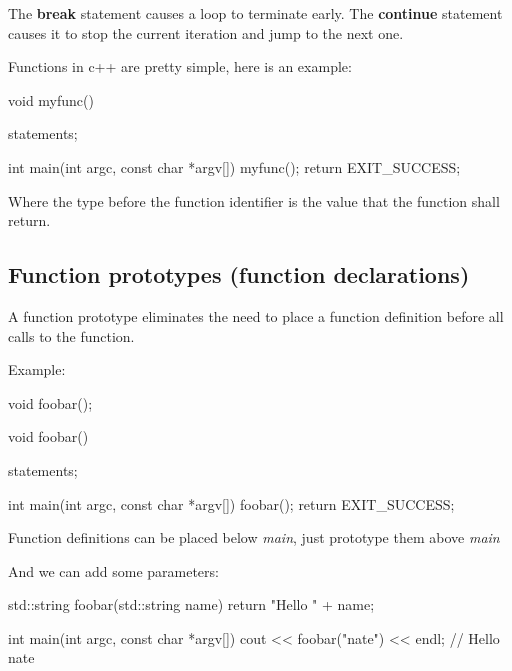 \documentclass{report}
\begin{document}
    \pagebreak
    \bigbreak \noindent 
    \begin{concept}
 The \textbf{break} statement causes a loop to terminate early. The \textbf{continue} statement causes it to stop the current iteration and jump to the next one.
	\end{concept}

    \pagebreak
    \bigbreak \noindent 
    Functions in c++ are pretty simple, here is an example:
    \bigbreak \noindent 
    
    \begin{cppcode}
void myfunc() {
    statements;

}
int main(int argc, const char *argv[]){ myfunc(); return EXIT_SUCCESS; }
    \end{cppcode}
    
    \bigbreak \noindent 
    Where the type before the function identifier is the value that the function shall return.
    \bigbreak \noindent 
    \subsection{Function prototypes (function declarations)}
    \bigbreak \noindent 
    \begin{concept}
 A function prototype eliminates the need to place a function definition before all calls to the function.
	\end{concept}
    \bigbreak \noindent 
    Example:
    \bigbreak \noindent 
    
    \begin{cppcode}
void foobar();

void foobar() {
    statements;

}
int main(int argc, const char *argv[]){ foobar(); return EXIT_SUCCESS; }
    \end{cppcode}
    
    \bigbreak \noindent 
    \begin{notebox}
        Function definitions can be placed below \textit{main}, just prototype them above \textit{main}
    \end{notebox}
    
    \bigbreak \noindent 
    And we can add some parameters:
    \bigbreak \noindent 
    
    \begin{cppcode}
std::string foobar(std::string name) {
    return "Hello " + name;
}  

int main(int argc, const char *argv[]){ cout << foobar("nate") << endl; } // Hello nate 
    \end{cppcode}
    
\end{document}

